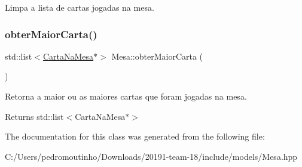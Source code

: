Limpa a lista de cartas jogadas na mesa. 

\mbox{\label{class_mesa_a3c48d9d5efdc8b26956245abb4c568ef}} 
\subsubsection{\texorpdfstring{obterMaiorCarta()}{obterMaiorCarta()}}
{\footnotesize\ttfamily std\+::list$<$\mbox{\hyperlink{class_carta_na_mesa}{Carta\+Na\+Mesa}}$\ast$$>$ Mesa\+::obter\+Maior\+Carta (\begin{DoxyParamCaption}{ }\end{DoxyParamCaption})}



Retorna a maior ou as maiores cartas que foram jogadas na mesa. 

\begin{DoxyReturn}{Returns}
std\+::list$<$\+Carta\+Na\+Mesa$\ast$$>$ 
\end{DoxyReturn}


The documentation for this class was generated from the following file\+:\begin{DoxyCompactItemize}
\item 
C\+:/\+Users/pedromoutinho/\+Downloads/20191-\/team-\/18/include/models/Mesa.\+hpp\end{DoxyCompactItemize}
